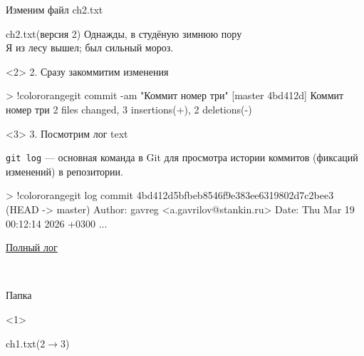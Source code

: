 \documentclass[9pt, aspectratio=1610]{beamer}
\begin{document}
\begin{frame}[fragile]
\begin{minipage}[t][\paperheight-3cm][t]{0.68\linewidth}
\begin{minipage}[t][5.2cm][t]{\linewidth}
\begin{onlyenv}
				Изменим файл ch2.txt
				\begin{block}{ch2.txt(версия 2)}
					Однажды, в студёную зимнюю пору\\ 
					Я из лесу вышел; был сильный мороз.
				\end{block}
			\end{onlyenv}	
			
			\begin{onlyenv}<2>
				2. Сразу закоммитим изменения
				
				\begin{VerbatimCmd}[gobble=5]
					
					> !color{orange}git commit -am "Коммит номер три"
					[master 4bd412d] Коммит номер три
					2 files changed, 3 insertions(+), 2 deletions(-)
					
				\end{VerbatimCmd}
			\end{onlyenv}
			
			\begin{onlyenv}<3>
				3. Посмотрим лог \hypertarget{ref:tolog}{text}
				
				\begin{alertblock}{\Verb|git log| ---}
					 основная команда в Git для просмотра истории коммитов (фиксаций изменений) в репозитории.
				\end{alertblock}
				
					\begin{VerbatimCmd}[gobble=5,fontsize=\footnotesize]
					
					
					> !color{orange}git log
					commit 4bd412d5bfbeb8546f9e383ee6319802d7c2bee3 (HEAD -> master)
					Author: gavreg <a.gavrilov@stankin.ru>
					Date:   Thu Mar 19 00:12:14 2026 +0300
					...
					
				\end{VerbatimCmd}
				
				\hyperlink{f:log}{Полный лог}

			\end{onlyenv}
				
			
		\end{minipage}\\
		\begin{minipage}[t][3cm][t]{\linewidth}
			\begin{minipage}[t]{0.29\linewidth}
				\begin{exampleblock}{Папка\strut}  %
					
					\begin{onlyenv}<1>
						\strut ch1.txt(2$\to$3)
						

\end{onlyenv}
\end{exampleblock}
\end{minipage}
\end{minipage}
\end{minipage}
\end{frame}
\end{document}
